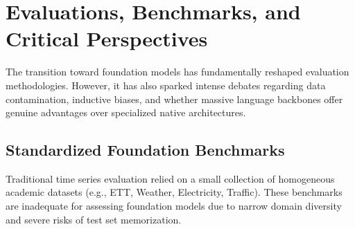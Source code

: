 \section{Evaluations, Benchmarks, and Critical Perspectives}
\label{sec:eval}

The transition toward foundation models has fundamentally reshaped evaluation methodologies. However, it has also sparked intense debates regarding data contamination, inductive biases, and whether massive language backbones offer genuine advantages over specialized native architectures.

\subsection{Standardized Foundation Benchmarks}

Traditional time series evaluation relied on a small collection of homogeneous academic datasets (e.g., ETT, Weather, Electricity, Traffic). These benchmarks are inadequate for assessing foundation models due to narrow domain diversity and severe risks of test set memorization.

